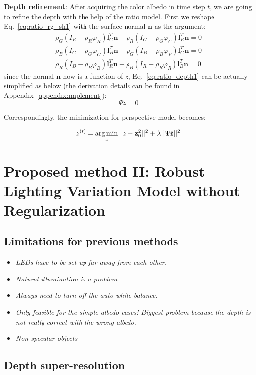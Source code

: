 \textbf{Depth refinement}:
After acquiring the color albedo in time step $t$, we are going to refine the depth with the help of the ratio model.
First we reshape Eq.~\ref{eq:ratio_rg_sh1} with the surface normal $\mathbf{n}$ as the argument:
\begin{equation}\label{eq:ratio_depth1}
\begin{split}
\rho_G (I_R - \rho_R \varphi_R)\mathbf{l}_G^T \mathbf{n} - \rho_R (I_G - \rho_G \varphi_G)\mathbf{l}_R^T\mathbf{n} = 0\\
\rho_B (I_G - \rho_G \varphi_G)\mathbf{l}_B^T \mathbf{n} - \rho_G (I_B - \rho_B \varphi_B)\mathbf{l}_G^T\mathbf{n} = 0\\
\rho_R (I_B - \rho_B \varphi_B)\mathbf{l}_R^T \mathbf{n} - \rho_B (I_R - \rho_R \varphi_R)\mathbf{l}_B^T\mathbf{n} = 0 
\end{split}
\end{equation}
since the normal $\mathbf{n}$ now is a function of $z$, Eq.~\ref{eq:ratio_depth1} can be actually simplified as below (the derivation details can be found in Appendix~\ref{appendix:implement}):
\begin{equation}
    \Psi z = 0
\end{equation}

Correspondingly, the minimization for perspective model becomes:

\begin{equation}\label{eq:z_c}
z^{(t)}= \operatorname*{arg\,min}_{z} ||z - \mathbf{z}_0^2||^2 + \lambda||\Psi \tilde{\mathbf{z}}||^2
\end{equation}



\section{Proposed method II: Robust Lighting Variation Model without Regularization}
\subsection{Limitations for previous methods}
\begin{itemize}
\item \emph{LEDs have to be set up far away from each other.}
\item \emph{Natural illumination is a problem.}
\item \emph{Always need to turn off the auto white balance.}
\item \emph{Only feasible for the simple albedo cases! Biggest problem because the depth is not really correct with the wrong albedo.}
\item \emph{Non specular objects}
\end{itemize}
\subsection{Depth super-resolution}



